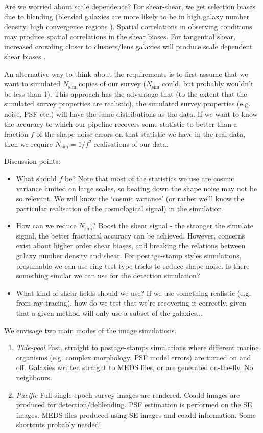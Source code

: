\documentclass[\docopts]{\docclass}
\begin{document}
Are we worried about scale dependence? For shear-shear, we get selection biases due to blending (blended galaxies are more likely to be in high galaxy number density, high convergence regions \citep{hartlap2011,maccrann2017}). Spatial correlations in observing conditions may produce spatial correlations in the shear biases. For tangential shear, increased crowding closer to clusters/lens galaxies will produce scale dependent shear biases \citep{melchior2015,simet2015}.

An alternative way to think about the requirements is to first assume that we want to simulated $N_{\mathrm{sim}}$ copies of our survey ($N_{\mathrm{sim}}$ could, but probably wouldn't be less than 1). This approach has the advantage that (to the extent that the simulated survey properties are realistic), the simulated survey properties (e.g. noise, PSF etc.) will have the same distributions as the data. If we want to know the accuracy to which our pipeline recovers some statistic  to better than a fraction $f$ of the shape noise errors on that statistic we have in the real data, then we require $N_{\mathrm{sim}} = 1/f^2$ realisations of our data. 

Discussion points:
\begin{itemize}
\item{What should $f$ be? Note that most of the statistics we use are cosmic variance limited on large scales, so beating down the shape noise may not be so relevant. We will know the `cosmic variance' (or rather we'll know the particular realisation of the cosmological signal) in the simulation.}
\item{How can we reduce $N_{\mathrm{sim}}$? Boost the shear signal - the stronger the simulate signal, the better fractional accuracy can be achieved. However, concerns exist about higher order shear biases, and breaking the relations between galaxy number density and shear. For postage-stamp styles simulations, presumable we can use ring-test type tricks to reduce shape noise. Is there something similar we can use for the detection simulation?}
\item{What kind of shear fields should we use? If we use something realistic (e.g. from ray-tracing), how do we test that we're recovering it correctly, given that a given method will only use a subset of the galaxies...}
\end{itemize}

We envisage two main modes of the image simulations. 
\begin{enumerate}
\item \emph{Tide-pool} Fast, straight to postage-stamps simulations where different marine organisms (e.g. complex morphology, PSF model errors) are turned on and off. Galaxies written straight to MEDS files, or are generated on-the-fly. No neighbours.
\item \emph{Pacific} Full single-epoch survey images are rendered. Coadd images are produced for detection/deblending. PSF estimation is performed on the SE images. MEDS files produced using SE images and coadd information. Some shortcuts probably needed!
\end{enumerate}
\end{document}
